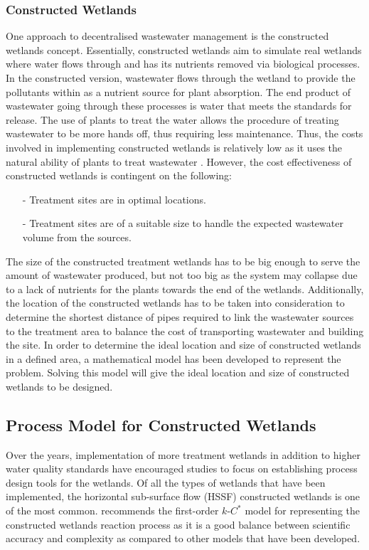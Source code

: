 \documentclass[preprint,12pt,authoryear]{elsarticle}
\begin{document}
\subsubsection{Constructed Wetlands}
One approach to decentralised wastewater management is the constructed wetlands concept. Essentially, constructed wetlands aim to simulate real wetlands where water flows through and has its nutrients removed via biological processes. In the constructed version, wastewater flows through the wetland to provide the pollutants within as a nutrient source for plant absorption. The end product of wastewater going through these processes is water that meets the standards for release. The use of plants to treat the water allows the procedure of treating wastewater to be more hands off, thus requiring less maintenance. Thus, the costs involved in implementing constructed wetlands is relatively low as it uses the natural ability of plants to treat wastewater \citep{kadlec2009,mawss2015}. However, the cost effectiveness of constructed wetlands is contingent on the following: 
\begin{itemize}
	\setlength{\itemsep}{0pt}
	\setlength{\parskip}{0pt}
	\setlength{\parsep}{0pt}
	\item[-] Treatment sites are in optimal locations. 
	\item[-] Treatment sites are of a suitable size to handle the expected wastewater volume from the sources. 
\end{itemize}
The size of the constructed treatment wetlands has to be big enough to serve the amount of wastewater produced, but not too big as the system may collapse due to a lack of nutrients for the plants towards the end of the wetlands. Additionally, the location of the constructed wetlands has to be taken into consideration to determine the shortest distance of pipes required to link the wastewater sources to the treatment area to balance the cost of transporting wastewater and building the site. \citep{mawss2015} In order to determine the ideal location and size of constructed wetlands in a defined area, a mathematical model has been developed to represent the problem. Solving this model will give the ideal location and size of constructed wetlands to be designed.

\subsection{Process Model for Constructed Wetlands}
Over the years, implementation of more treatment wetlands in addition to higher water quality standards have encouraged studies to focus on establishing process design tools for the wetlands. Of all the types of wetlands that have been implemented, the horizontal sub-surface flow (HSSF) constructed wetlands is one of the most common. \cite{rousseau2004model} recommends the first-order $k$-$C^*$ model for representing the constructed wetlands reaction process as it is a good balance between scientific accuracy and complexity as compared to other models that have been developed. 
\end{document}
